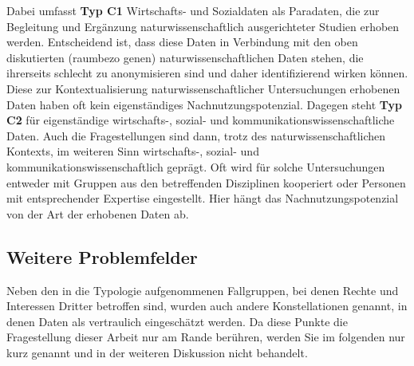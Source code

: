\documentclass[a4paper,
fontsize=11pt,
oneside,
numbers=noperiodatend,
parskip=half-,
bibliography=totoc,
final
]{scrartcl}
\begin{document}
Dabei umfasst \textbf{Typ C1} Wirtschafts- und Sozialdaten als
Paradaten, die zur Begleitung und Ergänzung naturwissenschaftlich
ausgerichteter Studien erhoben werden. Entscheidend ist, dass diese
Daten in Verbindung mit den oben diskutierten (raumbezo genen)
naturwissenschaftlichen Daten stehen, die ihrerseits schlecht zu
anonymisieren sind und daher identifizierend wirken können. Diese zur
Kontextualisierung naturwissenschaftlicher Untersuchungen erhobenen
Daten haben oft kein eigenständiges Nachnutzungspotenzial. Dagegen steht
\textbf{Typ C2} für eigenständige wirtschafts-, sozial- und
kommunikationswissenschaftliche Daten. Auch die Fragestellungen sind
dann, trotz des naturwissenschaftlichen Kontexts, im weiteren Sinn
wirtschafts-, sozial- und kommunikationswissenschaftlich geprägt. Oft
wird für solche Untersuchungen entweder mit Gruppen aus den betreffenden
Disziplinen kooperiert oder Personen mit entsprechender Expertise
eingestellt. Hier hängt das Nachnutzungspotenzial von der Art der
erhobenen Daten ab.

\hypertarget{weitere-problemfelder}{%
\subsection{Weitere Problemfelder}\label{weitere-problemfelder}}

Neben den in die Typologie aufgenommenen Fallgruppen, bei denen Rechte
und Interessen Dritter betroffen sind, wurden auch andere
Konstellationen genannt, in denen Daten als vertraulich eingeschätzt
werden. Da diese Punkte die Fragestellung dieser Arbeit nur am Rande
berühren, werden Sie im folgenden nur kurz genannt und in der weiteren
Diskussion nicht behandelt.
\end{document}
